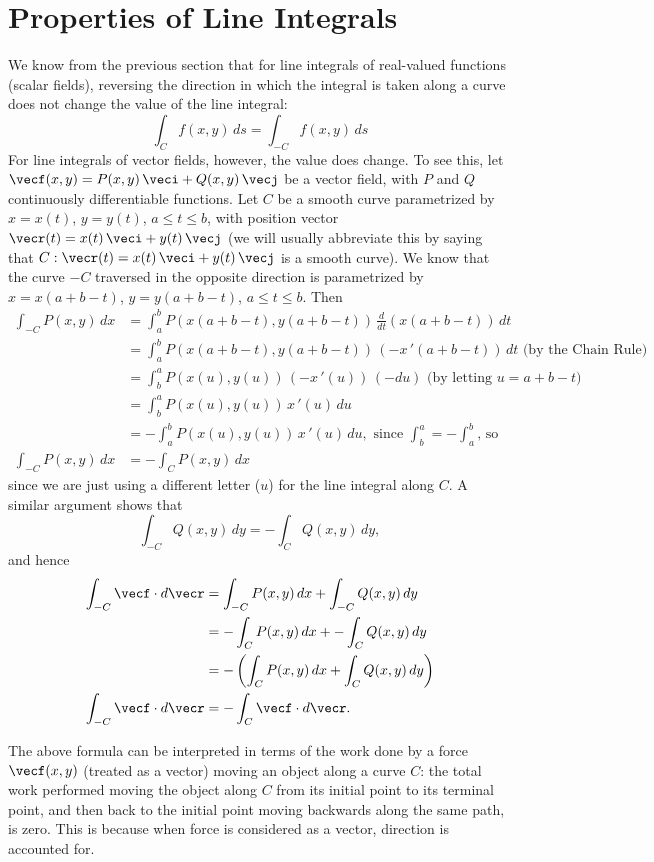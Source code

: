 \section{Properties of Line Integrals}\label{sec:line_int_props}

We know from the previous section that for line integrals of real-valued functions (scalar fields), reversing the direction in which the integral is taken along a curve does not change the value of the line integral:
\[\int_C f(x,y)\,ds = \int_{-C} f(x,y)\,ds\]
For line integrals of vector fields, however, the value does change. To see this, let $\vecf(x,y) =P(x,y)\,\veci + Q(x,y)\,\vecj$ be a vector field, with $P$ and $Q$ continuously differentiable functions. Let $C$ be a smooth curve parametrized by $x=x(t)$, $y=y(t)$, $a \le t \le b$, with position vector $\vecr(t) = x(t)\,\veci + y(t)\,\vecj$ (we will usually abbreviate this by saying that $C: \vecr(t) = x(t)\,\veci + y(t)\,\vecj$ is a smooth curve). We know that the curve $-C$ traversed in the opposite direction is parametrized by $x=x(a+b-t)$, $y=y(a+b-t)$, $a \le t \le b$. Then
\begin{align*}
 \int_{-C} P(x,y)\,dx &= \int_a^b P(x(a+b-t),y(a+b-t))\,\frac{d}{dt}(x(a+b-t))\,dt\\
  &= \int_a^b P(x(a+b-t),y(a+b-t))\,(-x\,'(a+b-t))\,dt\text{ (by the Chain Rule)}\\
  &= \int_b^a P(x(u),y(u))\,(-x\,'(u))\,(-du)\text{ (by letting $u=a+b-t$)}\\
  &= \int_b^a P(x(u),y(u))\,x\,'(u)\,du\\
  &= -\int_a^b P(x(u),y(u))\,x\,'(u)\,du,\text{ since $\int_b^a = -\int_a^b$, so}\\
  \int_{-C} P(x,y)\,dx &= -\int_C P(x,y)\,dx
\end{align*}
since we are just using a different letter ($u$) for the line integral along $C$. A similar argument shows that
\[\int_{-C} Q(x,y)\,dy = -\int_C Q(x,y)\,dy ,\]
and hence
\begin{align*}
 \int_{-C} \vecf\cdot d\vecr
 &= \int_{-C} P(x,y)\,dx + \int_{-C} Q(x,y)\,dy\\
  &= -\int_C P(x,y)\,dx + -\int_C Q(x,y)\,dy\\
  &= -\left( \int_C P(x,y)\,dx + \int_C Q(x,y)\,dy \right)\\
  \int_{-C} \vecf\cdot d\vecr &= -\int_C \vecf\cdot d\vecr .
\end{align*}

The above formula can be interpreted in terms of the work done by a force $\vecf(x,y)$ (treated as a vector) moving an object along a curve $C$: the total work performed moving the object along $C$ from its initial point to its terminal point, and then back to the initial point moving backwards along the same path, is zero. This is because when force is considered as a vector, direction is accounted for.

